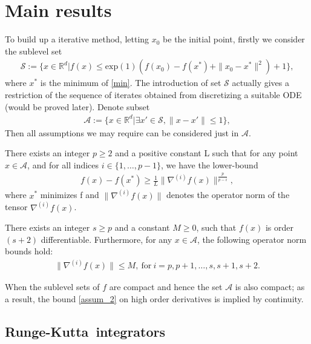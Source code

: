 \section{Main results}
To build up a iterative method, letting $x_{0}$ be the initial point, firstly we
consider the sublevel set
\begin{align}\label{sublevel_set}
  \mathcal{S} := \{ x \in \mathbb{R}^{d} | f(x) \leq \mathrm{exp}(1) (f(x_{0})
  - f(x^{*}) + \|x_{0} - x^{*}\|^{2}) + 1 \},
\end{align}
where $x^{*}$ is the minimum of \ref{min}. The introduction of set $\mathcal{S}$
actually gives a restriction of the sequence of iterates obtained from
discretizing a suitable ODE (would be proved later). Denote subset
\begin{align}
  \mathcal{A} := \{ x \in \mathbb{R}^{d} | \exists x' \in \mathcal{S}, \|x-x'\| \leq 1 \},
\end{align}
Then all assumptions we may require can be considered just in $\mathcal{A}$.

\begin{assumption}
  There exists an integer $p \geq 2$ and a positive constant L such that for any point $x \in \mathcal{A}$, and for all indices $i \in \{1,\ldots,p-1\}$, we have the lower-bound
  \begin{align}\label{assum_1}
    f(x) - f(x^{*}) \geq \frac{1}{L} \| \nabla^{(i)}f(x) \|^{\frac{p}{p-i}},
  \end{align}
  where $x^{*}$ minimizes f and $\| \nabla^{(i)}f(x) \|$ denotes the operator norm of the tensor $\nabla^{(i)}f(x)$.
\end{assumption}

\begin{assumption}
  There exists an integer $s \geq p$ and a constant $M \geq 0$, such that $f(x)$ is order $(s+2)$ differentiable. Furthermore, for any $x \in \mathcal{A}$, the following operator norm bounds hold:
  \begin{align}\label{assum_2}
    \| \nabla^{(i)}f(x) \| \leq M,\ \text{for}\ i = p,p+1,\ldots,s,s+1,s+2.
  \end{align}
\end{assumption}

When the sublevel sets of $f$ are compact and hence the set $\mathcal{A}$ is also compact; as a result, the bound \ref{assum_2} on high order derivatives is implied by continuity.

\subsection{Runge-Kutta\ integrators}

